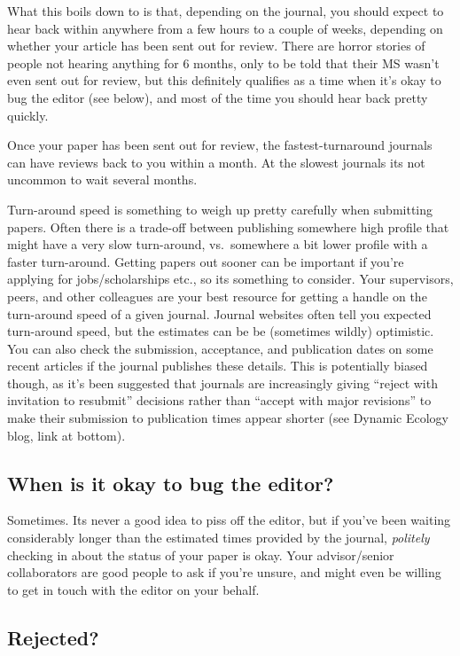 \documentclass[11pt,]{article}
\begin{document}
What this boils down to is that, depending on the journal, you should
expect to hear back within anywhere from a few hours to a couple of
weeks, depending on whether your article has been sent out for review.
There are horror stories of people not hearing anything for 6 months,
only to be told that their MS wasn't even sent out for review, but this
definitely qualifies as a time when it's okay to bug the editor (see
below), and most of the time you should hear back pretty quickly.

Once your paper has been sent out for review, the fastest-turnaround
journals can have reviews back to you within a month. At the slowest
journals its not uncommon to wait several months.

Turn-around speed is something to weigh up pretty carefully when
submitting papers. Often there is a trade-off between publishing
somewhere high profile that might have a very slow turn-around,
vs.~somewhere a bit lower profile with a faster turn-around. Getting
papers out sooner can be important if you're applying for
jobs/scholarships etc., so its something to consider. Your supervisors,
peers, and other colleagues are your best resource for getting a handle
on the turn-around speed of a given journal. Journal websites often tell
you expected turn-around speed, but the estimates can be be (sometimes
wildly) optimistic. You can also check the submission, acceptance, and
publication dates on some recent articles if the journal publishes these
details. This is potentially biased though, as it's been suggested that
journals are increasingly giving ``reject with invitation to resubmit''
decisions rather than ``accept with major revisions'' to make their
submission to publication times appear shorter (see Dynamic Ecology
blog, link at bottom).

\subsection{When is it okay to bug the
editor?}\label{when-is-it-okay-to-bug-the-editor}

Sometimes. Its never a good idea to piss off the editor, but if you've
been waiting considerably longer than the estimated times provided by
the journal, \emph{politely} checking in about the status of your paper
is okay. Your advisor/senior collaborators are good people to ask if
you're unsure, and might even be willing to get in touch with the editor
on your behalf.

\subsection{Rejected?}\label{rejected}
\end{document}
